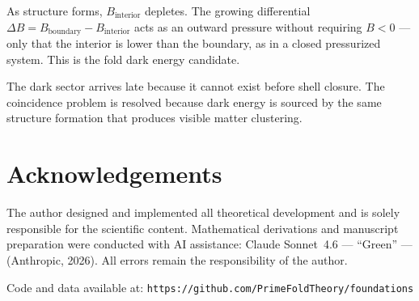 \documentclass[12pt]{article}
\begin{document}
As structure forms, $B_{\mathrm{interior}}$ depletes. The growing
differential $\Delta B = B_{\mathrm{boundary}} - B_{\mathrm{interior}}$
acts as an outward pressure without requiring $B < 0$ --- only that
the interior is lower than the boundary, as in a closed pressurized
system. This is the fold dark energy candidate.

The dark sector arrives late because it cannot exist before shell closure.
The coincidence problem is resolved because dark energy is sourced by
the same structure formation that produces visible matter clustering.

\begin{center}
\end{center}

\section*{Acknowledgements}

The author designed and implemented all theoretical development and is
solely responsible for the scientific content.
Mathematical derivations and manuscript preparation were conducted with
AI assistance: Claude Sonnet~4.6 --- ``Green'' --- (Anthropic, 2026).
All errors remain the responsibility of the author.

Code and data available at:
\texttt{https://github.com/PrimeFoldTheory/foundations}
\end{document}
